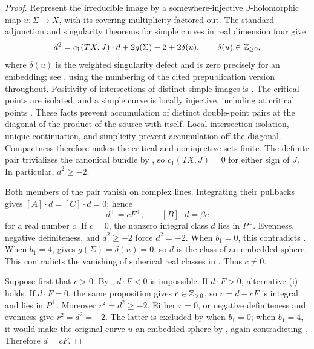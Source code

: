 \begin{proof}
Represent the irreducible image by a somewhere-injective
\(J\)-holomorphic map \(u:\Sigma\to X\), with its covering
multiplicity factored out.  The standard adjunction and singularity
theorems for simple curves in real dimension four give
\begin{equation}
\label{eq:lattice-adjunction}
  d^2=c_1(TX,J)\cdot d+2g(\Sigma)-2+2\delta(u),
  \qquad \delta(u)\in\mathbb Z_{\geq0},
\end{equation}
where \(\delta(u)\) is the weighted singularity defect and is zero
precisely for an embedding; see
\cite[Theorem~2.8]{Wendl2020}, using the numbering of the cited
prepublication version throughout.  Positivity of intersections of
distinct simple images is
\cite[Theorem~2.3 and Corollary~2.4]{Wendl2020}.
The critical points are isolated, and a simple curve is locally
injective, including at critical points
\cite[Propositions~B.26 and~B.41]{Wendl2020}.
These facts prevent accumulation of distinct double-point pairs at the
diagonal of the product of the source with itself.  Local intersection
isolation, unique continuation, and simplicity prevent accumulation off
the diagonal.
Compactness therefore makes the critical and noninjective sets finite.
The definite pair trivializes the canonical bundle by
, so \(c_1(TX,J)=0\) for either sign of \(J\).
In particular, \(d^2\geq-2\).

Both members of the pair vanish on complex lines.  Integrating their
pullbacks gives \([A]\cdot d=[C]\cdot d=0\); hence
\[
  d^+=cF^+,\qquad [B]\cdot d=\beta c
\]
for a real number \(c\).
If \(c=0\), the nonzero integral class \(d\) lies in \(P^\perp\).
Evenness, negative definiteness, and \(d^2\geq-2\) force \(d^2=-2\).
When \(b_1=0\), this contradicts .
When \(b_1=4\),  gives
\(g(\Sigma)=\delta(u)=0\), so \(d\) is the class of an embedded sphere.
This contradicts the vanishing of spherical real classes in
.  Thus \(c\ne0\).

Suppose first that \(c>0\).  By ,
\(d\cdot F<0\) is impossible.  If \(d\cdot F>0\), alternative
\textup{(i)} holds.  If \(d\cdot F=0\), the same proposition gives
\(c\in\mathbb Z_{>0}\), so \(r=d-cF\) is integral and lies in \(P^\perp\).
Moreover \(r^2=d^2\geq-2\).  Either \(r=0\), or negative definiteness
and evenness give \(r^2=d^2=-2\).  The latter is excluded by
 when \(b_1=0\); when \(b_1=4\), it would
make the original curve \(u\) an embedded sphere by
, again contradicting
.  Therefore \(d=cF\).


\end{proof}
